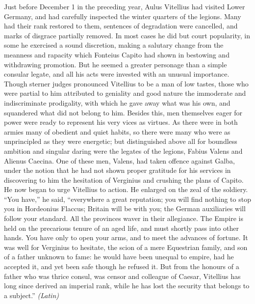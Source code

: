 
Just before December 1 in the preceding year, Aulus Vitellius had visited Lower Germany, and had carefully inspected the winter quarters of the legions. Many had their rank restored to them, sentences of degradation were cancelled, and marks of disgrace partially removed. In most cases he did but court popularity, in some he exercised a sound discretion, making a salutary change from the meanness and rapacity which Fonteius Capito had shown in bestowing and withdrawing promotion. But he seemed a greater personage than a simple consular legate, and all his acts were invested with an unusual importance. Though sterner judges pronounced Vitellius to be a man of low tastes, those who were partial to him attributed to geniality and good nature the immoderate and indiscriminate prodigality, with which he gave away what was his own, and squandered what did not belong to him. Besides this, men themselves eager for power were ready to represent his very vices as virtues. As there were in both armies many of obedient and quiet habits, so there were many who were as unprincipled as they were energetic; but distinguished above all for boundless ambition and singular daring were the legates of the legions, Fabius Valens and Alienus Caecina. One of these men, Valens, had taken offence against Galba, under the notion that he had not shown proper gratitude for his services in discovering to him the hesitation of Verginius and crushing the plans of Capito. He now began to urge Vitellius to action. He enlarged on the zeal of the soldiery. ``You have,'' he said, ``everywhere a great reputation; you will find nothing to stop you in Hordeonius Flaccus; Britain will be with you; the German auxiliaries will follow your standard. All the provinces waver in their allegiance. The Empire is held on the precarious tenure of an aged life, and must shortly pass into other hands. You have only to open your arms, and to meet the advances of fortune. It was well for Verginius to hesitate, the scion of a mere Equestrian family, and son of a father unknown to fame: he would have been unequal to empire, had he accepted it, and yet been safe though he refused it. But from the honours of a father who was thrice consul, was censor and colleague of Caesar, Vitellius has long since derived an imperial rank, while he has lost the security that belongs to a subject.'' \emph{(Latin)}


